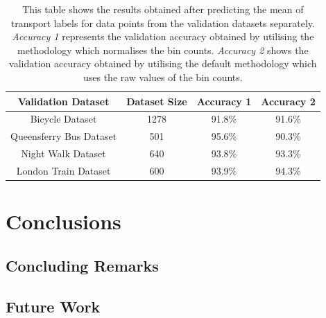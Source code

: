 \documentclass[bsc,frontabs,twoside,singlespacing,parskip,deptreport]{infthesis}     %
\begin{document}
\begin{table}[h!]
\centering
 \begin{tabular}{|| c | c | c | c ||} 
 \hline
 Validation Dataset & Dataset Size & Accuracy 1 & Accuracy 2 \\ [0.5ex] 
 \hline\hline
 Bicycle Dataset & 1278 &  91.8\% & 91.6\% \\ 
 \hline
 Queensferry Bus Dataset & 501 & 95.6\% & 90.3\% \\ 
 \hline
 Night Walk Dataset & 640 & 93.8\% & 93.3\% \\
 \hline
 London Train Dataset & 600 & 93.9\% & 94.3\% \\ 
 \hline
\end{tabular}
\caption{This table shows the results obtained after predicting the mean of transport labels for data points from the validation datasets separately. \textit{Accuracy 1} represents the validation accuracy obtained by utilising the methodology which normalises the bin counts. \textit{Accuracy 2} shows the validation accuracy obtained by utilising the default methodology which uses the raw values of the bin counts.}
\label{table:validation-results}
\end{table}

\chapter{Conclusions}

\section{Concluding Remarks}

\section{Future Work}




\end{document}
